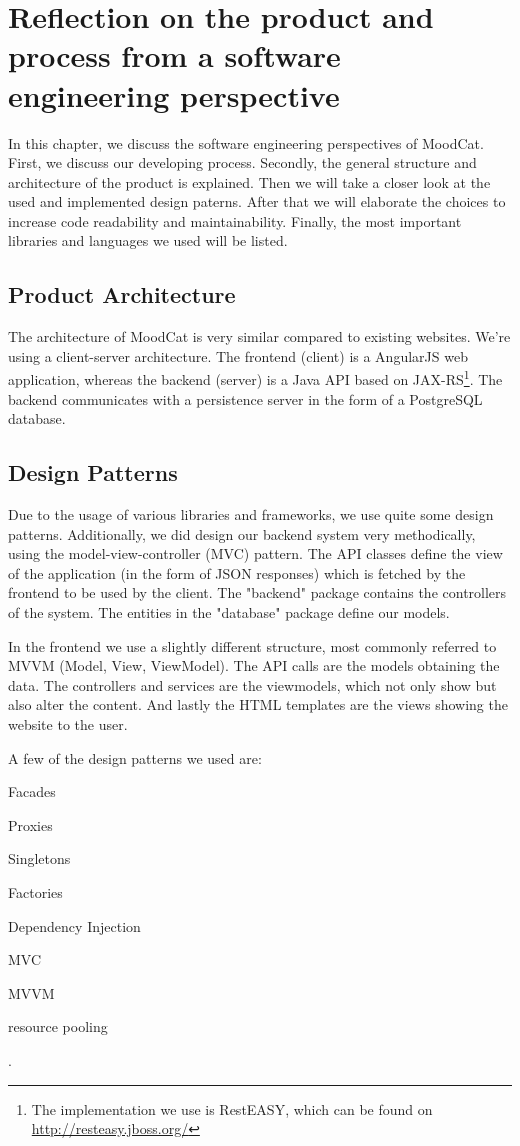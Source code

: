 \chapter{Reflection on the product and process from a software engineering perspective}
In this chapter, we discuss the software engineering perspectives of MoodCat.
First, we discuss our developing process.
Secondly, the general structure and architecture of the product is explained.
Then we will take a closer look at the used and implemented design paterns.
After that we will elaborate the choices to increase code readability and maintainability.
Finally, the most important libraries and languages we used will be listed.

\label{sec:product-architecture}
\section{Product Architecture}
The architecture of MoodCat is very similar compared to existing websites.
We're using a client-server architecture.
The frontend (client) is a AngularJS web application, whereas the backend (server) is a Java API based on JAX-RS\footnote{The implementation we use is RestEASY, which can be found on \url{http://resteasy.jboss.org/}}. 
The backend communicates with a persistence server in the form of a PostgreSQL database.

\section{Design Patterns}
Due to the usage of various libraries and frameworks, we use quite some design patterns.
Additionally, we did design our backend system very methodically, using the model-view-controller (MVC) pattern.
The API classes define the view of the application (in the form of JSON responses) which is fetched by the frontend to be used by the client.
The "backend" package contains the controllers of the system.
The entities in the "database" package define our models.

In the frontend we use a slightly different structure, most commonly referred to MVVM (Model, View, ViewModel).
The API calls are the models obtaining the data.
The controllers and services are the viewmodels, which not only show but also alter the content.
And lastly the HTML templates are the views showing the website to the user.

A few of the design patterns we used are:
\begin{commalist}
\item Facades
\item Proxies
\item Singletons
\item Factories
\item Dependency Injection
\item MVC
\item MVVM
\item resource pooling
\end{commalist}.

